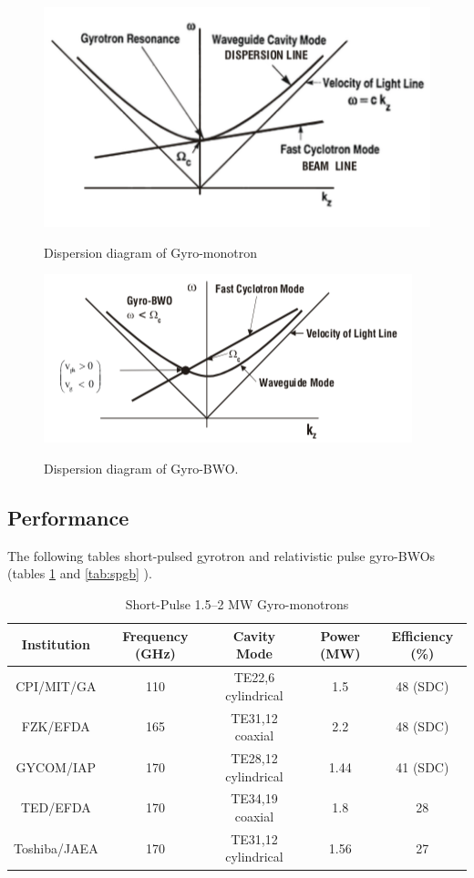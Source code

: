 \begin{figure}[H]
\centering
\includegraphics[scale=0.8]{images/gyro_mono_dispersion}
\label{ fig:gmd }
\caption{Dispersion diagram of Gyro-monotron}
\end{figure}
\begin{figure}
\includegraphics{images/gyro_bwo_dispersion}
\label{ fig:gbd }
\caption{Dispersion diagram of Gyro-BWO.}
\end{figure}



\subsection{Performance}
The following tables short-pulsed gyrotron and relativistic pulse gyro-BWOs (tables \ref{tab:spgm} and \ref{tab:spgb} ).

\begin{table}[H]
	\begin{tabular}{c|c|c|c|c}
	Institution & Frequency (GHz) & Cavity Mode & Power (MW) & Efficiency (\%) \\
	\hline
	CPI/MIT/GA & 110 & TE22,6 cylindrical & 1.5 & 48 (SDC)\\
	FZK/EFDA & 165 &TE31,12 coaxial & 2.2 & 48 (SDC)\\
	GYCOM/IAP & 170 & TE28,12 cylindrical &1.44 & 41 (SDC)\\
	TED/EFDA & 170 & TE34,19 coaxial & 1.8 & 28\\
	Toshiba/JAEA & 170 & TE31,12 cylindrical & 1.56 & 27
	\end{tabular}
	\caption{Short-Pulse 1.5–2 MW Gyro-monotrons\cite{ref:soa} }
	\label{tab:spgm}
\end{table}

